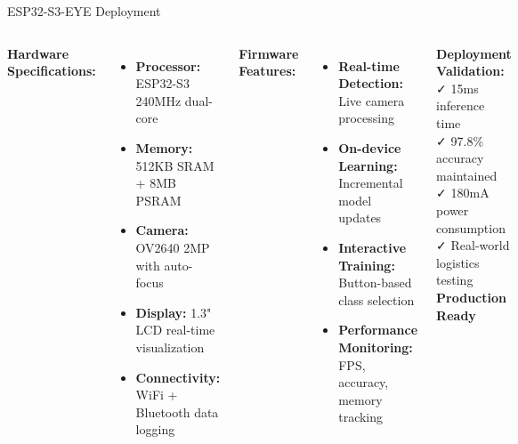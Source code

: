 \documentclass[aspectratio=169]{beamer}
\begin{document}
\begin{frame}{ESP32-S3-EYE Deployment}
\begin{columns}
\textbf{Hardware Specifications:}
\begin{itemize}
\item \textbf{Processor:} ESP32-S3 240MHz dual-core
\item \textbf{Memory:} 512KB SRAM + 8MB PSRAM
\item \textbf{Camera:} OV2640 2MP with auto-focus
\item \textbf{Display:} 1.3" LCD real-time visualization
\item \textbf{Connectivity:} WiFi + Bluetooth data logging
\end{itemize}

\vspace{0.3cm}
\textbf{Firmware Features:}
\begin{itemize}
\item \textbf{Real-time Detection:} Live camera processing
\item \textbf{On-device Learning:} Incremental model updates
\item \textbf{Interactive Training:} Button-based class selection
\item \textbf{Performance Monitoring:} FPS, accuracy, memory tracking
\end{itemize}

\begin{center}
\textbf{Deployment Validation:}\\
\vspace{0.3cm}
\textcolor{successgreen}{✓} 15ms inference time\\
\textcolor{successgreen}{✓} 97.8\% accuracy maintained\\
\textcolor{successgreen}{✓} 180mA power consumption\\
\textcolor{successgreen}{✓} Real-world logistics testing\\
\vspace{0.3cm}
\textcolor{umblue}{\textbf{Production Ready}}
\end{center}
\end{columns}
\end{frame}
\end{document}
